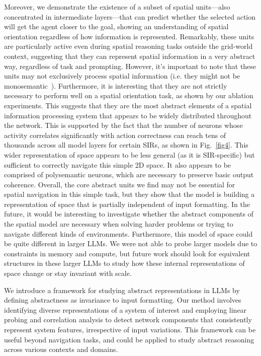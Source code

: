 \documentclass[runningheads]{llncs}
\begin{document}
Moreover, we demonstrate the existence of a subset of spatial units—also concentrated in intermediate layers—that can predict whether the selected action will get the agent closer to the goal, showing an understanding of spatial orientation regardless of how information is represented. Remarkably, these units are particularly active even during spatial reasoning tasks outside the grid-world context, suggesting that they can represent spatial information in a very abstract way, regardless of task and prompting. However, it’s important to note that these units may not exclusively process spatial information (i.e. they might not be monosemantic~\cite{Templeton2024,Bricken2023}). Furthermore, it is interesting that they are not strictly necessary to perform well on a spatial orientation task, as shown by our ablation experiments. This suggests that they are the most abstract elements of a spatial information processing system that appears to be widely distributed throughout the network. This is supported by the fact that the number of neurons whose activity correlates significantly with action correctness can reach tens of thousands across all model layers for certain SIRs, as shown in Fig.~\ref{fig4}. This wider representation of space appears to be less general (as it is SIR-specific) but sufficient to correctly navigate this simple 2D space. It also appears to be comprised of polysemantic neurons, which are necessary to preserve basic output coherence. Overall, the core abstract units we find may not be essential for spatial navigation in this simple task, but they show that the model is building a representation of space that is partially independent of input formatting. In the future, it would be interesting to investigate whether the abstract components of the spatial model are necessary when solving harder problems or trying to navigate different kinds of environments. Furthermore, this model of space could be quite different in larger LLMs. We were not able to probe larger models due to constraints in memory and compute, but future work should look for equivalent structures in these larger LLMs to study how these internal representations of space change or stay invariant with scale.

We introduce a framework for studying abstract representations in LLMs by defining abstractness as invariance to input formatting. Our method involves identifying diverse representations of a system of interest and employing linear probing and correlation analysis to detect network components that consistently represent system features, irrespective of input variations. This framework can be useful beyond navigation tasks, and could be applied to study abstract reasoning across various contexts and domains.
\end{document}
